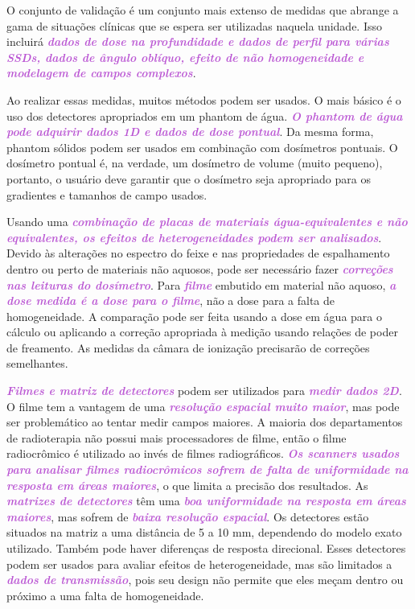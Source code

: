 \documentclass[11pt,a4paper]{article}
\begin{document}
	O conjunto de validação é um conjunto mais extenso de medidas que abrange a gama de situações clínicas que se espera ser utilizadas naquela unidade. Isso incluirá \textcolor{MediumOrchid}{\textbf{\textit{dados de dose na profundidade e dados de perfil para várias SSDs, dados de ângulo oblíquo, efeito de não homogeneidade e modelagem de campos complexos}}}. 

	Ao realizar essas medidas, muitos métodos podem ser usados. O mais básico é o uso dos detectores apropriados em um phantom de água. \textcolor{MediumOrchid}{\textbf{\textit{O phantom de água pode adquirir dados 1D e dados de dose pontual}}}. Da mesma forma, phantom sólidos podem ser usados em combinação com dosímetros pontuais. O dosímetro pontual é, na verdade, um dosímetro de volume (muito pequeno), portanto, o usuário deve garantir que o dosímetro seja apropriado para os gradientes e tamanhos de campo usados.

	Usando uma \textcolor{MediumOrchid}{\textbf{\textit{combinação de placas de materiais água-equivalentes e não equivalentes, os efeitos de heterogeneidades podem ser analisados}}}. Devido às alterações no espectro do feixe e nas propriedades de espalhamento dentro ou perto de materiais não aquosos, pode ser necessário fazer \textcolor{MediumOrchid}{\textbf{\textit{correções nas leituras do dosímetro}}}. Para \textcolor{MediumOrchid}{\textbf{\textit{filme}}} embutido em material não aquoso, \textcolor{MediumOrchid}{\textbf{\textit{a dose medida é a dose para o filme}}}, não a dose para a falta de homogeneidade. A comparação pode ser feita usando a dose em água para o cálculo ou aplicando a correção apropriada à medição usando relações de poder de freamento. As medidas da câmara de ionização precisarão de correções semelhantes.

	\textcolor{MediumOrchid}{\textbf{\textit{Filmes e  matriz de detectores}}} podem ser utilizados para \textcolor{MediumOrchid}{\textbf{\textit{medir dados 2D}}}. O filme tem a vantagem de uma \textcolor{MediumOrchid}{\textbf{\textit{resolução espacial muito maior}}}, mas pode ser problemático ao tentar medir campos maiores. A maioria dos departamentos de radioterapia não possui mais processadores de filme, então o filme radiocrômico é utilizado ao invés de filmes radiográficos. \textcolor{MediumOrchid}{\textbf{\textit{Os scanners usados para analisar filmes radiocrômicos sofrem de falta de uniformidade na resposta em áreas maiores}}}, o que limita a precisão dos resultados. As \textcolor{MediumOrchid}{\textbf{\textit{matrizes de detectores}}} têm uma \textcolor{MediumOrchid}{\textbf{\textit{boa uniformidade na resposta em áreas maiores}}}, mas sofrem de \textcolor{MediumOrchid}{\textbf{\textit{baixa resolução espacial}}}. Os detectores estão situados na matriz a uma distância de 5 a 10 mm, dependendo do modelo exato utilizado. Também pode haver diferenças de resposta direcional. Esses detectores podem ser usados para avaliar efeitos de heterogeneidade, mas são limitados a \textcolor{MediumOrchid}{\textbf{\textit{dados de transmissão}}}, pois seu design não permite que eles meçam dentro ou próximo a uma falta de homogeneidade.
\end{document}
